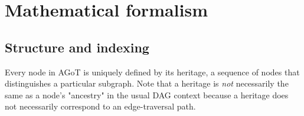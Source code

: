 \documentclass{article}
\begin{document}
\section{Mathematical formalism}
\label{sec:agot-formalism}






\subsection{Structure and indexing}\label{subsec:structure-indexing}
Every node in AGoT is uniquely defined by its heritage, a sequence of nodes that distinguishes a particular subgraph. Note that a heritage is \textit{not} necessarily the same as a node's "ancestry" in the usual DAG context because a heritage does not necessarily correspond to an edge-traversal path.
\end{document}
